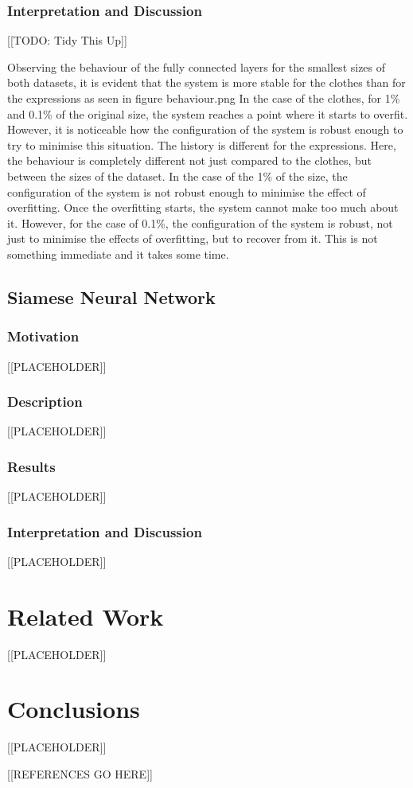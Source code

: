 \documentclass{article}
\begin{document}
\subsubsection{\textbf{Interpretation and Discussion}}

[[TODO: Tidy This Up]]

Observing the behaviour of the fully connected layers for the smallest sizes of both datasets, it is evident that the system is more stable for the clothes than for the expressions as seen in figure behaviour.png In the case of the clothes, for 1\% and 0.1\% of the original size, the system reaches a point where it starts to overfit. However, it is noticeable how the configuration of the system is robust enough to try to minimise this situation. The history is different for the expressions. Here, the behaviour is completely different not just compared to the clothes, but between the sizes of the dataset. In the case of the 1\% of the size, the configuration of the system is not robust enough to minimise the effect of overfitting. Once the overfitting starts, the system cannot make too much about it. However, for the case of 0.1\%, the configuration of the system is robust, not just to minimise the effects of overfitting, but to recover from it. This is not something immediate and it takes some time.

\subsection{Siamese Neural Network}

\subsubsection{\textbf{Motivation}}

[[PLACEHOLDER]]

\subsubsection{\textbf{Description}}

[[PLACEHOLDER]]

\subsubsection{\textbf{Results}}

[[PLACEHOLDER]]

\subsubsection{\textbf{Interpretation and Discussion}}

[[PLACEHOLDER]]

\section{Related Work}

[[PLACEHOLDER]]

\section{Conclusions}
\label{sec:conclusions}

[[PLACEHOLDER]]

[[REFERENCES GO HERE]]

%
%
\end{document}
